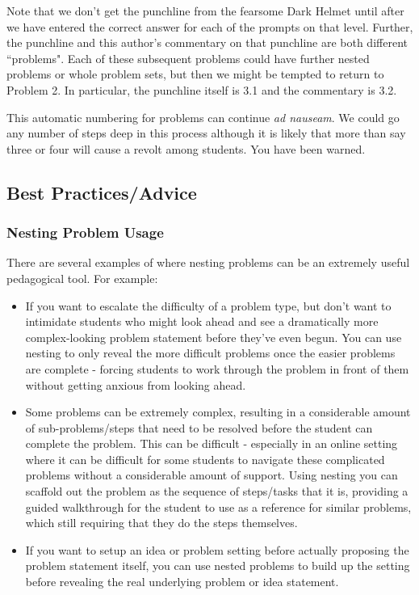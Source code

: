 \documentclass{ximera}
\begin{document}
            Note that we don't get the punchline from the fearsome Dark Helmet until after we have entered the correct answer for each of the prompts on that level. Further, the punchline and this author's commentary on that punchline are both different ``problems".  Each of these subsequent problems could have further nested problems or whole problem sets, but then we might be tempted to return to Problem 2.  In particular, the punchline itself is 3.1 and the commentary is 3.2. 
            
            This automatic numbering for problems can continue \textit{ad nauseam}.  We could go any number of steps deep in this process although it is likely that more than say three or four will cause a revolt among students.  You have been warned.
            
    \subsection*{Best Practices/Advice}
        \subsubsection*{Nesting Problem Usage}
            There are several examples of where nesting problems can be an extremely useful pedagogical tool. For example:
            \begin{itemize}
                \item If you want to escalate the difficulty of a problem type, but don't want to intimidate students who might look ahead and see a dramatically more complex-looking problem statement before they've even begun. You can use nesting to only reveal the more difficult problems once the easier problems are complete - forcing students to work through the problem in front of them without getting anxious from looking ahead.
                \item Some problems can be extremely complex, resulting in a considerable amount of sub-problems/steps that need to be resolved before the student can complete the problem. This can be difficult - especially in an online setting where it can be difficult for some students to navigate these complicated problems without a considerable amount of support. Using nesting you can scaffold out the problem as the sequence of steps/tasks that it is, providing a guided walkthrough for the student to use as a reference for similar problems, which still requiring that they do the steps themselves.
                \item If you want to setup an idea or problem setting before actually proposing the problem statement itself, you can use nested problems to build up the setting before revealing the real underlying problem or idea statement.
            \end{itemize}
\end{document}
